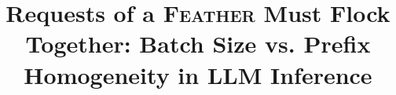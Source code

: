 \documentclass[sigplan,anonymous,review,nonacm]{acmart}
\newcommand{\Feather}{\textsc{Feather}\xspace}
\begin{document}
\title{Requests of a \Feather Must Flock Together: Batch Size vs. Prefix Homogeneity in LLM Inference}


 
\maketitle

















\end{document}
